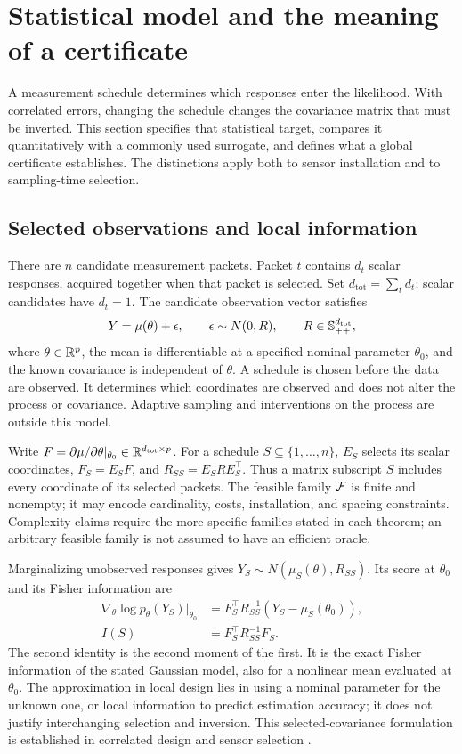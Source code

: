 \section{Statistical model and the meaning of a certificate}
\label{sec:foundations}
A measurement schedule determines which responses enter the likelihood. With
correlated errors, changing the schedule changes the covariance matrix that
must be inverted. This section specifies that statistical target, compares it
quantitatively with a commonly used surrogate, and defines what a global
certificate establishes. The distinctions apply both to sensor installation
and to sampling-time selection.

\subsection{Selected observations and local information}
\label{subsec:model}
There are $n$ candidate measurement packets. Packet $t$ contains $d_t$ scalar
responses, acquired together when that packet is selected. Set
$d_{\mathrm{tot}}=\sum_t d_t$; scalar candidates have $d_t=1$. The candidate
observation vector satisfies
\begin{equation}
 Y=\mu(\theta)+\epsilon,\qquad \epsilon\sim N(0,R),\qquad
 R\in\mathbb S_{++}^{d_{\mathrm{tot}}},
 \label{eq:observation-model}
\end{equation}
where $\theta\in\mathbb R^p$, the mean is differentiable at a specified nominal
parameter $\theta_0$, and the known covariance is independent of $\theta$.
A schedule is chosen before the data are observed. It determines which
coordinates are observed and does not alter the process or covariance.
Adaptive sampling and interventions on the process are outside this model.

Write $F=\partial\mu/\partial\theta|_{\theta_0}\in
\mathbb R^{d_{\mathrm{tot}}\times p}$. For a schedule $S\subseteq\{1,\ldots,n\}$,
$E_S$ selects its scalar coordinates, $F_S=E_SF$, and
$R_{SS}=E_SRE_S^\top$. Thus a matrix subscript $S$ includes every coordinate
of its selected packets. The feasible family $\mathcal F$ is finite and nonempty;
it may encode cardinality, costs, installation, and spacing constraints.
Complexity claims require the more specific families stated in each theorem;
an arbitrary feasible family is not assumed to have an efficient oracle.

Marginalizing unobserved responses gives
$Y_S\sim N(\mu_S(\theta),R_{SS})$. Its score at $\theta_0$ and its Fisher
information are
\begin{align}
 \nabla_\theta\log p_\theta(Y_S)|_{\theta_0}
 &=F_S^\top R_{SS}^{-1}(Y_S-\mu_S(\theta_0)),\\
 I(S)&=F_S^\top R_{SS}^{-1}F_S.
 \label{eq:true-information}
\end{align}
The second identity is the second moment of the first. It is the exact
Fisher information of the stated Gaussian model, also for a nonlinear mean
evaluated at $\theta_0$. The approximation in local design lies in using a
nominal parameter for the unknown one, or local information to predict
estimation accuracy; it does not justify interchanging selection and
inversion. This selected-covariance formulation is established in correlated
design and sensor selection \citep{Patan2007,Liu2016,Pazman2022}.

